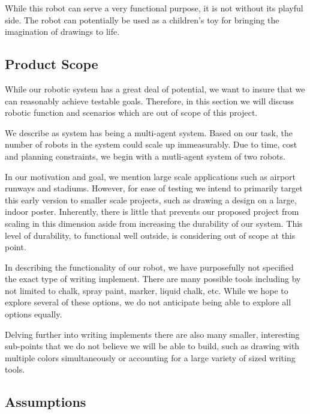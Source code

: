 While this robot can serve a very functional purpose, it is not without its playful side. The robot can potentially be used as a children's toy for bringing the imagination of drawings to life. 


\subsection{Product Scope}
\label{sec:project_scope}
While our robotic system has a great deal of potential, we want to insure that we can reasonably achieve testable goals. Therefore, in this section we will discuss robotic function and scenarios which are out of scope of this project. 

We describe as system has being a multi-agent system. Based on our task, the number of robots in the system could scale up immeasurably. Due to time, cost and planning constraints, we begin with a mutli-agent system of two robots. 

In our motivation and goal, we mention large scale applications such as airport runways and stadiums. However, for ease of testing we intend to primarily target this early version to smaller scale projects, such as drawing a design on a large, indoor poster. Inherently, there is little that prevents our proposed project from scaling in this dimension aside from increasing the durability of our system. This level of durability, to functional well outside, is considering out of scope at this point. 

In describing the functionality of our robot, we have purposefully not specified the exact type of writing implement. There are many possible tools including by not limited to chalk, spray paint, marker, liquid chalk, etc. While we hope to explore several of these options, we do not anticipate being able to explore all options equally. 

Delving further into writing implements there are also many smaller, interesting sub-points that we do not believe we will be able to build, such as drawing with multiple colors simultaneously or accounting for a large variety of sized writing tools. 

\subsection{Assumptions}
\label{sec:assumptions}

